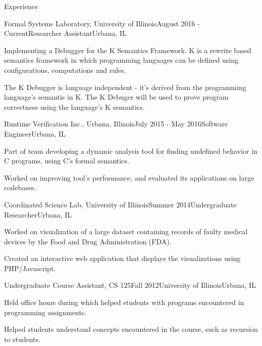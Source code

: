 \documentclass{resume} %
\begin{document}
\begin{rSection}{Experience}

\begin{rSubsection}{Formal Systems Laboratory, University of Illinois}{August 2016 - Current}{Researcher Assistant}{Urbana, IL}
    \item Implementing a Debugger for the K Semantics Framework. K is a rewrite based
        semantics framework in which programming languages can be defined using configurations, computations and rules.
    \item The K Debugger is language independent - it's derived from the programming language's semantis in K.
        The K Debuger will be used to prove program correctness using the language's K semantics.
\end{rSubsection}
\begin{rSubsection}{Runtime Verification Inc., Urbana, Illinois}{July 2015 - May 2016}{Software Engineer}{Urbana, IL}
    \item Part of team developing a dynamic analysis tool for finding undefined behavior in C programs, using C's formal semantics.
    \item Worked on improving tool's performance, and evaluated its applications on large codebases.
\end{rSubsection}
\begin{rSubsection}{Coordinated Science Lab, University of Illinois}{Summer 2014}{Undergraduate Researcher}{Urbana, IL}
    \item Worked on visualization of a large dataset containing records of faulty medical devices by the Food and Drug Administration (FDA).
    \item Created an interactive web application that displays the visualizations using PHP/Javascript.
\end{rSubsection}
\begin{rSubsection}{Undergraduate Course Assistant, CS 125}{Fall 2012}{University of Illinois}{Urbana, IL}
    \item Held office hours during which helped students with programs encountered in programming assignments.
    \item Helped students understand concepts encountered in the course, such as recursion to students.
\end{rSubsection}
\end{rSection}
\end{document}
